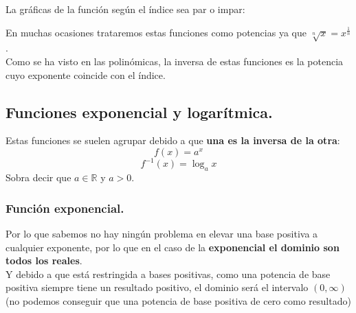 \documentclass[a4paper,11pt,answers]{exam}
\begin{document}
La gráficas de la función según el índice sea par o impar:
\begin{center}
\hspace{1cm}
\end{center}

En muchas ocasiones trataremos estas funciones como potencias ya que $\sqrt[n]{x} = x^\frac{1}{n}$.\\

Como se ha visto en las polinómicas, la inversa de estas funciones es la potencia cuyo exponente coincide con el índice.
\subsection{Funciones exponencial y logarítmica.}
Estas funciones se suelen agrupar debido a que \textbf{una es la inversa de la otra}:
\[f(x) = a^x\]
\[f^{-1}(x) = \log_a x\]
Sobra decir que $a \in \mathbb{R}$ y $a> 0$.\\

\subsubsection{Función exponencial.}
Por lo que sabemos no hay ningún problema en elevar una base positiva a cualquier exponente, por lo que en el caso de la \textbf{exponencial el dominio son todos los reales}.\\
Y debido a que está restringida a bases positivas, como una potencia de base positiva siempre tiene un resultado positivo, el dominio será el intervalo $(0, \infty)$ (no podemos conseguir que una potencia de base positiva de cero como resultado)\\
\end{document}
